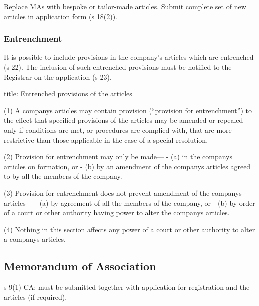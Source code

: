 \documentclass[
]{article}
\newenvironment{Shaded}{}{}
\newcommand{\NormalTok}[1]{#1}
\begin{document}
Replace MAs with bespoke or tailor-made articles. Submit complete set of
new articles in application form (s 18(2)).

\hypertarget{entrenchment}{%
\subsubsection{Entrenchment}\label{entrenchment}}

It is possible to include provisions in the company's articles which are
entrenched (s 22). The inclusion of such entrenched provisions must be
notified to the Registrar on the application (s 23).

\begin{Shaded}
\begin{Highlighting}[]
\NormalTok{title: Entrenched provisions of the articles}

\NormalTok{(1) A company\textquotesingle{}s articles may contain provision (“provision for entrenchment”) to the effect that specified provisions of the articles may be amended or repealed only if conditions are met, or procedures are complied with, that are more restrictive than those applicable in the case of a special resolution.}

\NormalTok{(2) Provision for entrenchment may only be made—}
\NormalTok{{-} (a) in the company\textquotesingle{}s articles on formation, or}
\NormalTok{{-} (b) by an amendment of the company\textquotesingle{}s articles agreed to by all the members of the company.}

\NormalTok{(3) Provision for entrenchment does not prevent amendment of the company\textquotesingle{}s articles—}
\NormalTok{{-} (a) by agreement of all the members of the company, or}
\NormalTok{{-} (b) by order of a court or other authority having power to alter the company\textquotesingle{}s articles.}

\NormalTok{(4) Nothing in this section affects any power of a court or other authority to alter a company\textquotesingle{}s articles.}
\end{Highlighting}
\end{Shaded}

\hypertarget{memorandum-of-association}{%
\subsection{Memorandum of Association}\label{memorandum-of-association}}

s 9(1) CA: must be submitted together with application for registration
and the articles (if required).
\end{document}
